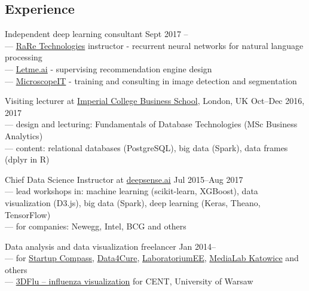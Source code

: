\documentclass[margin,line]{resume}
\begin{document}
\begin{resume}
    \section{\mysidestyle Experience}

    \begin{list2}

    \item Independent deep learning consultant \hfill {Sept 2017 --}\\
      --- \href{https://rare-technologies.com/}{RaRe Technologies} instructor - recurrent neural networks for natural language processing\\
      --- \href{https://letme.ai/}{Letme.ai} - supervising recommendation engine design\\
      --- \href{http://www.microscopeit.com/}{MicroscopeIT} - training and consulting in image detection and segmentation

    \item Visiting lecturer at \href{https://wwwf.imperial.ac.uk/business-school/}{Imperial College Business School}, London, UK \hfill Oct--Dec 2016, 2017\\
        --- design and lecturing: Fundamentals of Database Technologies (MSc Business Analytics)\\
        --- content: relational databases (PostgreSQL), big data (Spark), data frames (dplyr in R)

    \item Chief Data Science Instructor at \href{https://deepsense.ai/}{deepsense.ai} \hfill Jul 2015--Aug 2017\\
        --- lead workshops in: machine learning (scikit-learn, XGBoost), data visualization (D3.js), big data (Spark), deep learning (Keras, Theano, TensorFlow)\\
        --- for companies: Newegg, Intel, BCG and others

    \item Data analysis and data visualization freelancer  \hfill Jan 2014--\\
        --- for \href{http://compass.co}{Startup Compass}, \href{http://www.data4cure.com/}{Data4Cure}, \href{https://laboratorium.ee/en}{LaboratoriumEE}, \href{https://medialabkatowice.eu/en/}{MediaLab Katowice} and others\\
        --- \href{http://nucleus3d.cent.uw.edu.pl/influenza/}{3DFlu -- influenza visualization} for CENT, University of Warsaw


\end{list2}
\end{resume}
\end{document}
